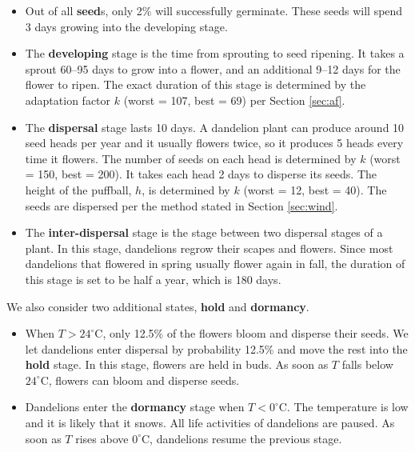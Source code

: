 \documentclass[12pt]{article}
\begin{document}
		\begin{itemize}
			
			\item Out of all \textbf{seed}s, only 2\% will successfully germinate\autocite{honek2005post}.  These seeds will spend 3 days growing into the developing stage\autocite{stewart2002biology}.
			
			\item The \textbf{developing} stage is the time from sprouting to seed ripening.  It takes a sprout 60--95 days to grow into a flower, and an additional 9--12 days for the flower to ripen\autocite{gardenorganicNAripen}.  The exact duration of this stage is determined by the adaptation factor $k$ (worst = 107, best = 69) per Section \ref{sec:af}.
			
			\item The \textbf{dispersal} stage lasts 10 days.  A dandelion plant can produce around 10 seed heads per year and it usually flowers twice, so it produces 5 heads every time it flowers.  The number of seeds on each head is determined by $k$ (worst = 150, best = 200)\autocite{dukeNAdandelion}.  It takes each head 2 days to disperse its seeds.  The height of the puffball, $h$, is determined by $k$ (worst = 12, best = 40)\autocite{veggiegardenNAstem}.  The seeds are dispersed per the method stated in Section \ref{sec:wind}.
			
			\item The \textbf{inter-dispersal} stage is the stage between two dispersal stages of a plant.  In this stage, dandelions regrow their scapes and flowers.  Since most dandelions that flowered in spring usually flower again in fall\autocite{stewart2002biology}, the duration of this stage is set to be half a year, which is 180 days.   
			
		\end{itemize}
		We also consider two additional states, \textbf{hold} and \textbf{dormancy}.		
		\begin{itemize}
			
			\item When $T > 24^\circ$C, only 12.5\% of the flowers bloom and disperse their seeds\autocite{yoshie2020effects}.  We let dandelions enter dispersal by probability 12.5\% and move the rest into the \textbf{hold} stage.  In this stage, flowers are held in buds.  As soon as $T$ falls below $24^\circ$C, flowers can bloom and disperse seeds.  
		
			\item Dandelions enter the \textbf{dormancy} stage when $T < 0^\circ$C.  The temperature is low and it is likely that it snows.  All life activities of dandelions are paused.  As soon as $T$ rises above $0^\circ$C, dandelions resume the previous stage.
		
		\end{itemize}
		
\end{document}
